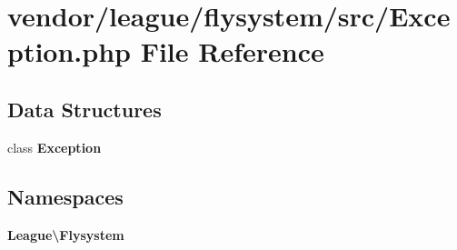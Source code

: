 \section{vendor/league/flysystem/src/\+Exception.php File Reference}
\label{league_2flysystem_2src_2_exception_8php}
\subsection*{Data Structures}
\begin{DoxyCompactItemize}
\item 
class {\bf Exception}
\end{DoxyCompactItemize}
\subsection*{Namespaces}
\begin{DoxyCompactItemize}
\item 
 {\bf League\textbackslash{}\+Flysystem}
\end{DoxyCompactItemize}
